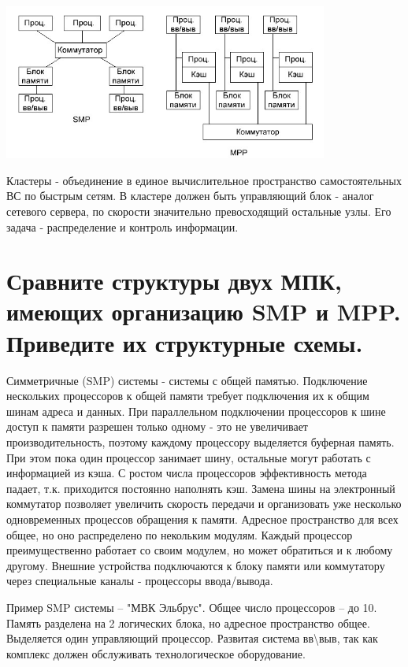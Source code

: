 \documentclass[unicode, 12pt, a4paper, oneside]{article}
\begin{document}
\begin{center}
\includegraphics[width=0.8\textwidth]{117_SMP_MPP.png}\\
\end{center}
Кластеры - объединение в единое вычислительное пространство самостоятельных ВС по быстрым сетям. В кластере должен быть управляющий блок - аналог сетевого сервера, по скорости значительно превосходящий остальные узлы. Его задача - распределение и контроль информации.

\section{Сравните структуры двух МПК, имеющих организацию SMP и MPP. Приведите их структурные схемы.}

Симметричные (SMP) системы - системы с общей памятью. Подключение нескольких процессоров к общей памяти требует подключения их к общим шинам адреса и данных. При параллельном подключении процессоров к шине доступ к памяти разрешен только одному - это не увеличивает производительность, поэтому каждому процессору выделяется буферная память. При этом пока один процессор занимает шину, остальные могут работать с информацией из кэша. С ростом числа процессоров эффективность метода падает, т.к. приходится постоянно наполнять кэш. Замена шины на электронный коммутатор позволяет увеличить скорость передачи и организовать уже несколько одновременных процессов обращения к памяти. Адресное пространство для всех общее, но оно распределено по некольким модулям. Каждый процессор преимущественно работает со своим модулем, но может обратиться и к любому другому. Внешние устройства подключаются к блоку памяти или коммутатору через специальные каналы - процессоры ввода/вывода.

Пример SMP системы – "МВК Эльбрус". Общее число процессоров – до 10. Память разделена на 2 логических блока, но адресное пространство общее. Выделяется один управляющий процессор. Развитая система вв\textbackslash выв, так как комплекс должен обслуживать технологическое оборудование.
\end{document}
